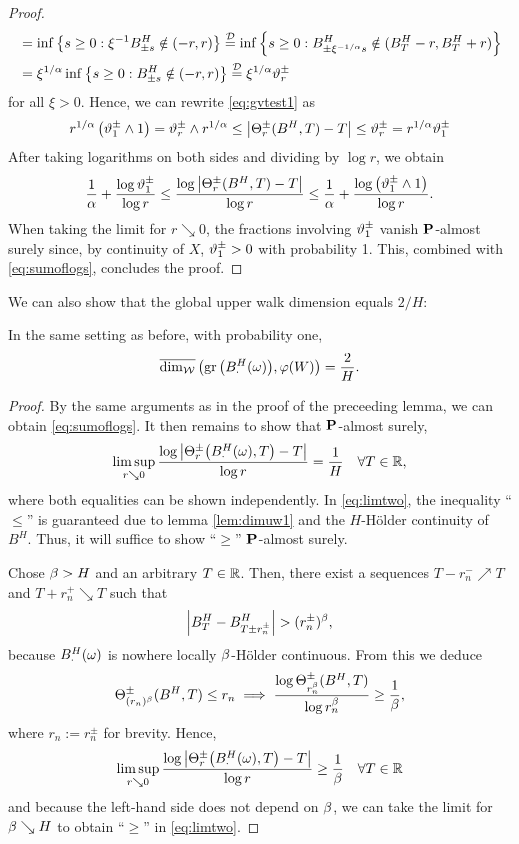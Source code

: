 \begin{proof}
\begin{align*}
     &=\inf\left\{s\geq0:\xi^{-1}B^H_{\pm s}\notin(-r,r)\right\}
      \stackrel{\mathcal{D}}{=}\inf\left\{s\geq0:B^H_{\pm\xi^{-1/\alpha}s}
         \notin (B^H_T-r,B^H_T+r)\right\}\\
     &=\xi^{1/\alpha}\inf\left\{s\geq0:B^H_{\pm s}\notin(-r,r)\right\}
      \stackrel{\mathcal{D}}{=}\xi^{1/\alpha}\vartheta_r^{\pm}
  \end{align*}
  for all $\xi>0$. Hence, we can rewrite \eqref{eq:gvtest1} as
  \begin{equation}\label{eq:gvtest2}
    r^{1/\alpha}\left(\vartheta_1^\pm\wedge 1\right)
    =\vartheta_r^\pm\wedge r^{1/\alpha}
    \leq \left|\Theta^\pm_r(B^H,T)-T\right|
    \leq \vartheta_r^{\pm}
    =r^{1/\alpha}\vartheta_1^\pm
  \end{equation}
  After taking logarithms on both sides and dividing by $\log r$, we obtain
  \[
    \frac{1}{\alpha}+\frac{\log \vartheta^\pm_1}{\log r}
    \leq \frac{\log \left|\Theta^\pm_r(B^H,T)-T\right|}{\log r}
    \leq \frac{1}{\alpha}+\frac{\log \left(\vartheta_1^\pm\wedge 1\right)}
      {\log r}.
  \]
  When taking the limit for $r\searrow 0$, the fractions involving 
  $\vartheta_1^\pm$ vanish $\mathbf{P}$-almost surely since, by continuity of 
  $X$, $\vartheta_1^\pm>0$ with probability 1. This, combined with \eqref{eq:sumoflogs}, concludes the proof.
\end{proof}
We can also show that the global upper walk dimension equals $2/H$:
\begin{lem}\label{lem:BMdimuw}
  In the same setting as before, with probability one, 
  \[
    \overline{\dim_{\mathcal{W}}}\left(\operatorname{gr}\big(B^H_{\cdot}(\omega)\big),\varphi(W)\right)=\frac{2}{H}.
  \]
\end{lem}
\begin{proof}
  By the same arguments as in the proof of the preceeding lemma, we can obtain \eqref{eq:sumoflogs}. It then remains to show that $\mathbf{P}$-almost surely, 
  \begin{equation}\label{eq:limtwo}
    \limsup_{r\searrow 0}\frac{\log\left|\Theta^{\pm}_r\big(B^H_\cdot(\omega),T\big)-T\right|}{\log r}=\frac{1}{H}\ \ \ \forall T\in\mathbb{R},
  \end{equation}
  where both equalities can be shown independently.
  In \eqref{eq:limtwo}, the inequality ``$\leq$''  is guaranteed due to lemma \ref{lem:dimuw1} and the $H$-H\"older continuity of $B^H$.
  Thus, it will suffice to show ``$\geq$'' $\mathbf{P}$-almost surely. 
  
  Chose $\beta>H$ and an arbitrary $T\in\mathbb{R}$. Then, there exist a sequences $T-r^-_n\nearrow T$ and $T+r^+_n\searrow T$ such that 
  \[
    \left|B^H_T-B^H_{T\pm r^{\pm}_n}\right|>(r^{\pm}_n)^\gb,
  \]
  because $B^H_{\cdot}(\omega)$ is nowhere locally $\beta$-H\"{o}lder continuous. From this we deduce 
  \[
    \Theta^{\pm}_{(r_n)^\beta}(B^H,T)\leq r_n \implies
    \frac{\log \Theta^{\pm}_{r_n^\beta}(B^H,T)}{\log r_n^\beta} 
    \geq \frac{1}{\beta},
  \]
  where $r_n:=r_n^{\pm}$ for brevity. Hence, 
  \[
    \limsup_{r\searrow 0}\frac{\log\left|\Theta^{\pm}_r\big(B^H_\cdot(\omega),T\big)-T\right|}{\log r}\geq\frac{1}{\beta}\ \ \ \forall T\in\mathbb{R}
  \]
  and because the left-hand side does not depend on $\beta$, we can take the limit for $\beta\searrow H$ to obtain ``$\geq$'' in \eqref{eq:limtwo}. 
\end{proof}

